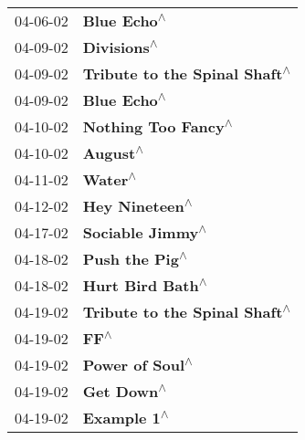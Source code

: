 \begin{supertabular}{p{0.25\columnwidth}p{0.75\columnwidth}}
 04-06-02 &                                                                \textbf{Blue Echo\textsuperscript{$\wedge$}} \\
 04-09-02 &                                                                \textbf{Divisions\textsuperscript{$\wedge$}} \\
 04-09-02 &                                              \textbf{Tribute to the Spinal Shaft\textsuperscript{$\wedge$}} \\
 04-09-02 &                                                                \textbf{Blue Echo\textsuperscript{$\wedge$}} \\
 04-10-02 &                                                        \textbf{Nothing Too Fancy\textsuperscript{$\wedge$}} \\
 04-10-02 &                                                                   \textbf{August\textsuperscript{$\wedge$}} \\
 04-11-02 &                                                                    \textbf{Water\textsuperscript{$\wedge$}} \\
 04-12-02 &                                                             \textbf{Hey Nineteen\textsuperscript{$\wedge$}} \\
 04-17-02 &                                                           \textbf{Sociable Jimmy\textsuperscript{$\wedge$}} \\
 04-18-02 &                                                             \textbf{Push the Pig\textsuperscript{$\wedge$}} \\
 04-18-02 &                                                           \textbf{Hurt Bird Bath\textsuperscript{$\wedge$}} \\
 04-19-02 &                                              \textbf{Tribute to the Spinal Shaft\textsuperscript{$\wedge$}} \\
 04-19-02 &                                                                       \textbf{FF\textsuperscript{$\wedge$}} \\
 04-19-02 &                                                            \textbf{Power of Soul\textsuperscript{$\wedge$}} \\
 04-19-02 &                                                                 \textbf{Get Down\textsuperscript{$\wedge$}} \\
 04-19-02 &                                                                \textbf{Example 1\textsuperscript{$\wedge$}} \\

\end{supertabular}
